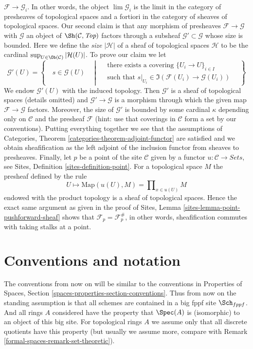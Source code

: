 \begin{remark}
$\mathcal{F} \to \mathcal{G}_i$. In other words, the object
$\lim \mathcal{G}_i$ is the limit in the category
of presheaves of topological spaces and a fortiori in the
category of sheaves of topological spaces.
Our second claim is that any morphism of presheaves
$\mathcal{F} \to \mathcal{G}$ with $\mathcal{G}$ an object of
$\Sh(\mathcal{C}, \textit{Top})$ factors through a subsheaf
$\mathcal{G}' \subset \mathcal{G}$ whose size is bounded.
Here we define the {\it size} $|\mathcal{H}|$
of a sheaf of topological spaces $\mathcal{H}$ to be the cardinal
$\sup_{U \in \Ob(\mathcal{C})} |\mathcal{H}(U)|$.
To prove our claim we let
$$
\mathcal{G}'(U) =
\left\{
\quad
s \in \mathcal{G}(U)
\quad \middle| \quad
\begin{matrix}
\text{there exists a covering }\{U_i \to U\}_{i \in I} \\
\text{such that }
s|_{U_i} \in \Im(\mathcal{F}(U_i) \to \mathcal{G}(U_i))
\end{matrix}
\quad
\right\}
$$
We endow $\mathcal{G}'(U)$ with the induced topology.
Then $\mathcal{G}'$ is a sheaf of topological spaces (details omitted)
and $\mathcal{G}' \to \mathcal{G}$ is a morphism through which
the given map $\mathcal{F} \to \mathcal{G}$ factors. Moreover,
the size of $\mathcal{G}'$ is bounded by some cardinal
$\kappa$ depending only on $\mathcal{C}$ and the presheaf $\mathcal{F}$
(hint: use that coverings in $\mathcal{C}$
form a set by our conventions). Putting everything together we see
that the assumptions of Categories, Theorem
\ref{categories-theorem-adjoint-functor}
are satisfied and we obtain sheafification as the left
adjoint of the inclusion functor from sheaves to presheaves.
Finally, let $p$ be a point of the
site $\mathcal{C}$ given by a functor $u : \mathcal{C} \to \textit{Sets}$,
see Sites, Definition \ref{sites-definition-point}.
For a topological space $M$ the presheaf defined by the rule
$$
U \mapsto \text{Map}(u(U), M) = \prod\nolimits_{x \in u(U)} M
$$
endowed with the product topology is a sheaf of topological spaces.
Hence the exact same argument as given in the proof of
Sites, Lemma \ref{sites-lemma-point-pushforward-sheaf} shows that
$\mathcal{F}_p = \mathcal{F}^\#_p$, in other words, sheafification
commutes with taking stalks at a point.
\end{remark}

\section{Conventions and notation}
\label{formal-spaces-section-conventions}
The conventions from now on will be similar to the conventions in
Properties of Spaces, Section \ref{spaces-properties-section-conventions}.
Thus from now on the standing assumption is that all schemes are contained
in a big fppf site $\Sch_{fppf}$. And all rings $A$ considered have the
property that $\Spec(A)$ is (isomorphic) to an object of this big site.
For topological rings $A$ we assume only that all discrete quotients have
this property (but usually we assume more, compare with
Remark \ref{formal-spaces-remark-set-theoretic}).

